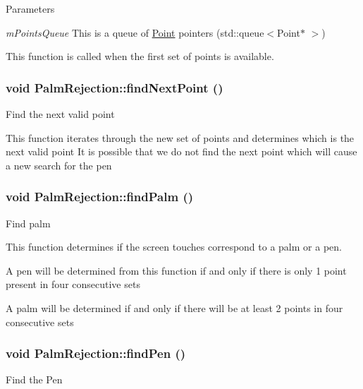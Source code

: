 \begin{DoxyParams}{Parameters}
\item[{\em mPointsQueue}]This is a queue of \hyperlink{classPoint}{Point} pointers (std::queue$<$Point$\ast$ $>$)\end{DoxyParams}
This function is called when the first set of points is available. \hypertarget{classPalmRejection_ac3474032f6f0919c4857c010e4da0b78}{
\subsubsection[{findNextPoint}]{\setlength{\rightskip}{0pt plus 5cm}void PalmRejection::findNextPoint ()}}
\label{classPalmRejection_ac3474032f6f0919c4857c010e4da0b78}
Find the next valid point

This function iterates through the new set of points and determines which is the next valid point It is possible that we do not find the next point which will cause a new search for the pen \hypertarget{classPalmRejection_aa1bb74f3b45634d99796274c320dafd0}{
\subsubsection[{findPalm}]{\setlength{\rightskip}{0pt plus 5cm}void PalmRejection::findPalm ()}}
\label{classPalmRejection_aa1bb74f3b45634d99796274c320dafd0}
Find palm

This function determines if the screen touches correspond to a palm or a pen.

A pen will be determined from this function if and only if there is only 1 point present in four consecutive sets

A palm will be determined if and only if there will be at least 2 points in four consecutive sets \hypertarget{classPalmRejection_a948d8d4d9123b8c926e72226df3a29c5}{
\subsubsection[{findPen}]{\setlength{\rightskip}{0pt plus 5cm}void PalmRejection::findPen ()}}
\label{classPalmRejection_a948d8d4d9123b8c926e72226df3a29c5}
Find the Pen

